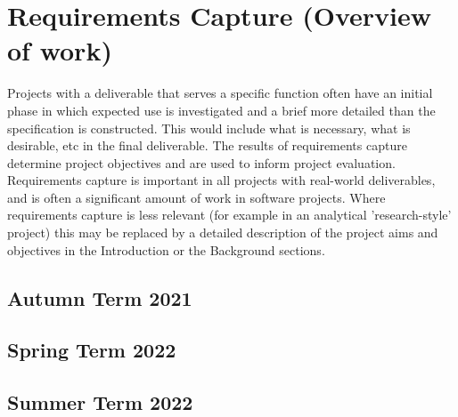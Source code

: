 \section{Requirements Capture (Overview of work)}
Projects with a deliverable that serves a specific
function often have an initial phase in which expected
use is investigated and a brief more detailed than the
specification is constructed. This would include what
is necessary, what is desirable, etc in the final
deliverable. The results of requirements capture
determine project objectives and are used to inform
project evaluation.\\ \newline \noindent Requirements capture is important in all projects with
real-world deliverables, and is often a significant
amount of work in software projects. Where
requirements capture is less relevant (for example in
an analytical 'research-style' project) this may be
replaced by a detailed description of the project aims
and objectives in the Introduction or the Background
sections.

\subsection{Autumn Term 2021}

\subsection{Spring Term 2022}

\subsection{Summer Term 2022}